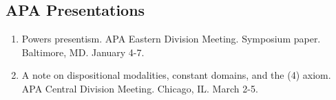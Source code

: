 \subsection{APA Presentations}
\begin{enumerate}
	\setcounter{enumi}{\value{presentationCounter}}	%
\item {}
{Powers presentism. APA Eastern Division Meeting. Symposium paper. Baltimore, MD. January 4-7.}
{}
\item {}
{A note on dispositional modalities, constant domains, and the (4) axiom. APA Central Division Meeting. Chicago, IL. March 2-5.}
{}
	\setcounter{presentationCounter}{\value{enumi}}	%
\end{enumerate}
                 

